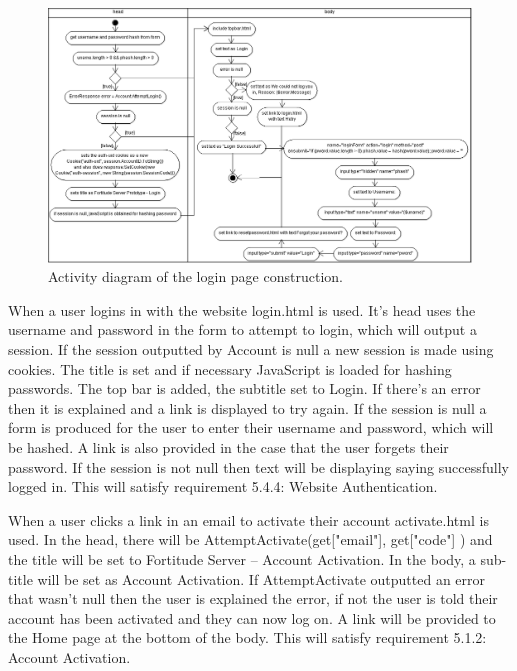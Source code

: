 \begin{landscape}
\begin{figure}
    \centering
    \includegraphics[width=1.1\textheight]{images/activity/loginWeb2}
    \caption{Activity diagram of the login page construction.}
\end{figure}
\end{landscape}

When a user logins in with the website login.html is used. It's head uses the username and password in the form to attempt to login, which will output a session. If the session outputted by Account is null a new session is made using cookies. The title is set and if necessary JavaScript is loaded for hashing passwords. The top bar is added, the subtitle set to Login. If there's an error then it is explained and a link is displayed to try again. If the session is null a form is produced for the user to enter their username and password, which will be hashed. A link is also provided in the case that the user forgets their password. If the session is not null then text will be displaying saying successfully logged in. This will satisfy requirement 5.4.4: Website Authentication.

When a user clicks a link in an email to activate their account activate.html is used. In the head, there will be AttemptActivate(get["email"], get["code"] ) and the title will be set to Fortitude Server – Account Activation. In the body, a sub-title will be set as Account Activation. If AttemptActivate outputted an error that wasn't null then the user is explained the error, if not the user is told their account has been activated and they can now log on. A link will be provided to the Home page at the bottom of the body. This will satisfy requirement 5.1.2: Account Activation.


